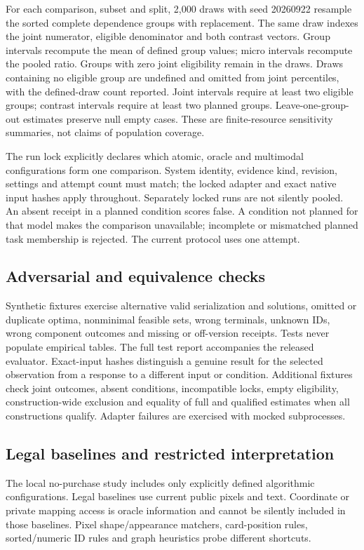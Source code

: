 \documentclass[10pt,twocolumn,letterpaper]{article}
\begin{document}
For each comparison, subset and split, 2,000 draws with seed
20260922 resample the sorted complete dependence groups with
replacement. The same draw indexes the joint numerator, eligible
denominator and both contrast vectors. Group intervals recompute
the mean of defined group values; micro intervals recompute the
pooled ratio. Groups with zero joint eligibility remain in the
draws. Draws containing no eligible group are undefined and omitted
from joint percentiles, with the defined-draw count reported.
Joint intervals require at least two eligible groups; contrast
intervals require at least two planned groups. Leave-one-group-out
estimates preserve null empty cases. These are finite-resource
sensitivity summaries, not claims of population coverage.

The run lock explicitly declares which atomic, oracle and multimodal
configurations form one comparison. System identity, evidence kind,
revision, settings and attempt count must match; the locked adapter
and exact native input hashes apply throughout. Separately locked
runs are not silently pooled. An absent receipt in a planned
condition scores false. A condition not planned for that model
makes the comparison unavailable; incomplete or mismatched planned
task membership is rejected. The current protocol uses one attempt.

\subsection{Adversarial and equivalence checks}
Synthetic fixtures exercise alternative valid serialization and
solutions, omitted or duplicate optima, nonminimal feasible sets,
wrong terminals, unknown IDs, wrong component outcomes and missing
or off-version receipts. Tests never populate empirical tables.
The full test report accompanies the released evaluator.
Exact-input hashes distinguish a genuine result for the selected
observation from a response to a different input or condition.
Additional fixtures check joint outcomes, absent conditions,
incompatible locks, empty eligibility, construction-wide exclusion
and equality of full and qualified estimates when all constructions
qualify. Adapter failures are exercised with mocked subprocesses.

\subsection{Legal baselines and restricted interpretation}
The local no-purchase study includes only explicitly defined
algorithmic configurations. Legal baselines use current public
pixels and text. Coordinate or private mapping access is oracle
information and cannot be silently included in those baselines.
Pixel shape/appearance matchers, card-position rules, sorted/numeric
ID rules and graph heuristics probe different shortcuts.
\end{document}
